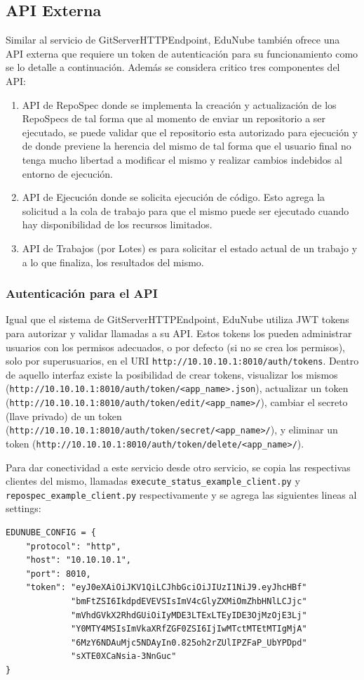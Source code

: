 \subsection{API Externa}
Similar al servicio de GitServerHTTPEndpoint, EduNube también ofrece una API externa que requiere un token de autenticación para su funcionamiento como se lo detalle a continuación. Además se considera critico tres componentes del API:
\begin{enumerate}
  \item API de RepoSpec donde se implementa la creación y actualización de los RepoSpecs de tal forma que al momento de enviar un repositorio a ser ejecutado, se puede validar que el repositorio esta autorizado para ejecución y de donde previene la herencia del mismo de tal forma que el usuario final no tenga mucho libertad a modificar el mismo y realizar cambios indebidos al entorno de ejecución.
  \item API de Ejecución donde se solicita ejecución de código. Esto agrega la solicitud a la cola de trabajo para que el mismo puede ser ejecutado cuando hay disponibilidad de los recursos limitados.
  \item API de Trabajos (por Lotes) es para solicitar el estado actual de un trabajo y a lo que finaliza, los resultados del mismo.
\end{enumerate}
\subsubsection{Autenticación para el API}
Igual que el sistema de GitServerHTTPEndpoint, EduNube utiliza JWT tokens para autorizar y validar llamadas a su API. Estos tokens  los pueden administrar usuarios con los permisos adecuados, o por defecto (si no se crea los permisos), solo por superusuarios, en el URI \texttt{http://10.10.10.1:8010/auth/tokens}. Dentro de aquello interfaz existe la posibilidad de crear tokens, visualizar los mismos \\
(\texttt{http://10.10.10.1:8010/auth/token/<app\_name>.json}), actualizar un token (\texttt{http://10.10.10.1:8010/auth/token/edit/<app\_name>/}), cambiar el secreto (llave privado) de un token\\
(\texttt{http://10.10.10.1:8010/auth/token/secret/<app\_name>/}), y eliminar un token (\texttt{http://10.10.10.1:8010/auth/token/delete/<app\_name>/}).

Para dar conectividad a este servicio desde otro servicio, se copia las respectivas clientes del mismo, llamadas \texttt{execute\_status\_example\_client.py} y \\
\texttt{repospec\_example\_client.py} respectivamente y se agrega las siguientes lineas al settings:
\lstset{language=Python}
\begin{lstlisting}
EDUNUBE_CONFIG = {
    "protocol": "http",
    "host": "10.10.10.1",
    "port": 8010,
    "token": "eyJ0eXAiOiJKV1QiLCJhbGciOiJIUzI1NiJ9.eyJhcHBf"
             "bmFtZSI6IkdpdEVEVSIsImV4cGlyZXMiOmZhbHNlLCJjc"
             "mVhdGVkX2RhdGUiOiIyMDE3LTExLTEyIDE3OjMzOjE3Lj"
             "Y0MTY4MSIsImVkaXRfZGF0ZSI6IjIwMTctMTEtMTIgMjA"
             "6MzY6NDAuMjc5NDAyIn0.825oh2rZUlIPZFaP_UbYPDpd"
             "sXTE0XCaNsia-3NnGuc"
}
\end{lstlisting}

